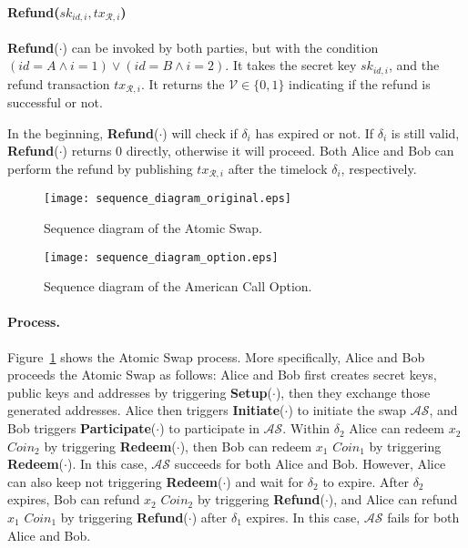 \paragraph{\textbf{Refund}($sk_{id, i}, tx_{\mathcal{R}, i}$)}
\textbf{Refund}($\cdot$) can be invoked by both parties, but with the condition $(id = A \wedge i = 1) \vee (id = B \wedge i = 2)$.
It takes the secret key $sk_{id, i}$,
and the refund transaction $tx_{\mathcal{R}, i}$.
It returns the $\mathcal{V} \in \{0, 1\}$ indicating if the refund is successful or not.

In the beginning, \textbf{Refund}($\cdot$) will check if $\delta_i$ has expired or not. If $\delta_i$ is still valid, \textbf{Refund}($\cdot$) returns $0$ directly, otherwise it will proceed.
Both Alice and Bob can perform the refund by publishing $tx_{\mathcal{R}, i}$ after the timelock $\delta_i$, respectively.



\begin{figure}
    \texttt{[image: sequence\_diagram\_original.eps]}
    \caption{Sequence diagram of the Atomic Swap.}
    \label{fig:sequence_diagram_original}
\end{figure}

\begin{figure}
    \texttt{[image: sequence\_diagram\_option.eps]}
    \caption{Sequence diagram of the American Call Option.}
    \label{fig:sequence_diagram_option}
\end{figure}


\paragraph{Process.}
Figure~\ref{fig:sequence_diagram_original} shows the Atomic Swap process.
More specifically, Alice and Bob proceeds the Atomic Swap as follows:
Alice and Bob first creates secret keys, public keys and addresses by triggering \textbf{Setup}($\cdot$), then they exchange those generated addresses.
Alice then triggers \textbf{Initiate}($\cdot$) to initiate the swap $\mathcal{AS}$, and Bob triggers \textbf{Participate}($\cdot$) to participate in $\mathcal{AS}$.
Within $\delta_2$ Alice can redeem $x_2$ $Coin_2$ by triggering \textbf{Redeem}($\cdot$), then Bob can redeem $x_1$ $Coin_1$ by triggering \textbf{Redeem}($\cdot$).
In this case, $\mathcal{AS}$ succeeds for both Alice and Bob.
However, Alice can also keep not triggering \textbf{Redeem}($\cdot$) and wait for $\delta_2$ to expire.
After $\delta_2$ expires, Bob can refund $x_2$ $Coin_2$ by triggering \textbf{Refund}($\cdot$), and Alice can refund $x_1$ $Coin_1$ by triggering \textbf{Refund}($\cdot$) after $\delta_1$ expires.
In this case, $\mathcal{AS}$ fails for both Alice and Bob.


